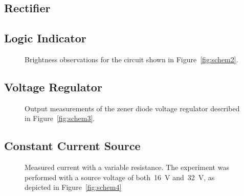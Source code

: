 \subsection{Rectifier}

\subsection{Logic Indicator}
\begin{figure}[H]
	\centering
	
	\caption{Brightness observations for the circuit shown in
		Figure~\ref{fig:schem2}.}
	\label{tab:ckt2data}
\end{figure}

\subsection{Voltage Regulator}
\begin{figure}[H]
	\centering
	
	\caption{Output measurements of the zener diode voltage
		regulator described in Figure~\ref{fig:schem3}.}
	\label{tab:ckt3data}
\end{figure}

\subsection{Constant Current Source}
\begin{figure}[H]
	\centering
	
	\caption{Measured current with a variable resistance.  The experiment was
		performed with a source voltage of both~\SI{16}{\volt}
		and~\SI{32}{\volt}, as depicted in Figure~\ref{fig:schem4}}
	\label{tab:ckt4data}
\end{figure}
